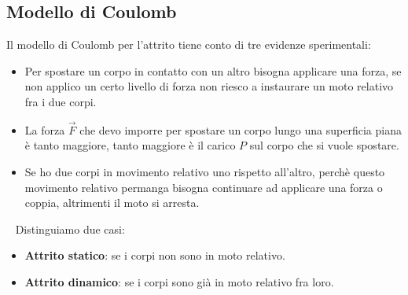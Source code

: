 \subsection{Modello di Coulomb}
Il modello di Coulomb per l'attrito tiene conto di tre evidenze sperimentali:
\begin{itemize}
    \item Per spostare un corpo in contatto con un altro bisogna applicare una forza, se non applico un certo livello di forza non riesco a instaurare un moto relativo fra i due corpi.
    \item La forza $\vec{F}$ che devo imporre per spostare un corpo lungo una superficia piana è tanto maggiore, tanto maggiore è il carico $P$ sul corpo che si vuole spostare.
    \item Se ho due corpi in movimento relativo uno rispetto all'altro, perchè questo movimento relativo permanga bisogna continuare ad applicare una forza o coppia, altrimenti il moto si arresta.
\end{itemize}
\ \newline
Distinguiamo due casi:
\begin{itemize}
    \item \textbf{Attrito statico}: se i corpi non sono in moto relativo.
    \item \textbf{Attrito dinamico}: se i corpi sono già in moto relativo fra loro. 
\end{itemize}
